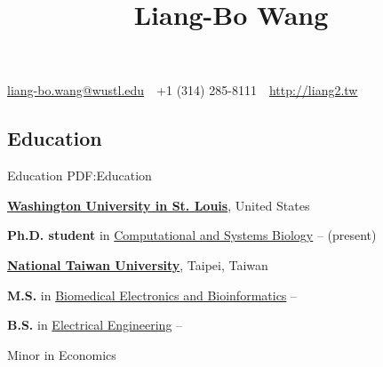 \documentclass[a4paper,12pt,oneside]{article}
\begin{document}

\title{Liang-Bo Wang}

\begin{subtitle}
\href{mailto:liang-bo.wang@wustl.edu}
{liang-bo.wang@wustl.edu}
\,\BulletSymbol\,
+1 (314) 285-8111
\,\BulletSymbol\,
\href{http://liang2.tw}
{http://liang2.tw}
\end{subtitle}

\begin{body}


\section
{Education}
{Education}
{PDF:Education}


\href{https://wustl.edu/}
{\textbf{Washington University in St. Louis}},
United States
\par
\textbf{Ph.D. student} in
\href{http://dbbs.wustl.edu/divprograms/compbio/Pages/default.aspx}
{Computational and Systems Biology}
\hfill
{} --
(present)

\BigEntryGap

\href{http://www.ntu.edu.tw/english/index.html}
{\textbf{National Taiwan University}},
Taipei, Taiwan
\par
\textbf{M.S.} in
\href{http://www.bebi.ntu.edu.tw/English/index.html}
{Biomedical Electronics and Bioinformatics}
\hfill
{} --


\EntryGapNoBreak
\textbf{B.S.} in
\href{http://www.ee.ntu.edu.tw/en/}
{Electrical Engineering}
\hfill
{} --
\par
Minor in Economics


\end{body}
\end{document}
